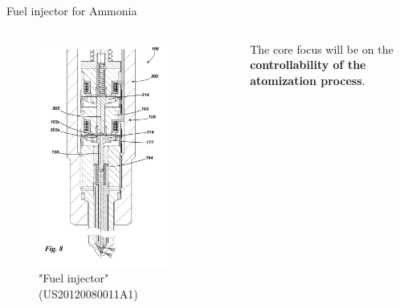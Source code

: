 \begin{frame}{Fuel injector for Ammonia}

    \begin{columns}[c, onlytextwidth]

        \begin{column}{0.4\textwidth}

            \begin{figure}[H]
                \centering
                \includegraphics[width=0.8\textwidth]{img/injector-drawing.png}
                \caption{"Fuel injector" (US20120080011A1)}
            \end{figure}

        \end{column}

        \begin{column}{0.6\textwidth}

            The core focus will be on the \textbf{controllability of the atomization process}.


\end{column}
\end{columns}
\end{frame}
